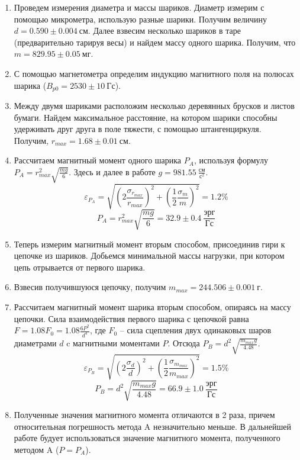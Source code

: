 \documentclass[14pt, a4paper]{report}
\begin{document}
\begin{enumerate}

\setcounter{enumi}{0}

\item Проведем измерения диаметра и массы шариков. Диаметр измерим с помощью микрометра, использую разные шарики. Получим величину $d=0.590\pm0.004\ см$. Далее взвесим несколько шариков в таре (предварительно тарируя весы) и найдем массу одного шарика. Получим, что $m=829.95\pm0.05\ мг$.

\item С помощью магнетометра определим индукцию магнитного поля на полюсах шарика ($B_{p0}=2530\pm10\ Гс$).

\item Между двумя шариками расположим несколько деревянных брусков и листов бумаги. Найдем максимальное расстояние, на котором шарики способны удерживать друг друга в поле тяжести, с помощью штангенциркуля. Получим, $r_{max}=1.68\pm0.01\ см$.

\item Рассчитаем магнитный момент одного шарика $P_A$, используя формулу $P_A=r_{max}^2\sqrt{\frac{mg}{6}}$. Здесь и далее в работе $g=981.55\ \frac{см}{с^2}$.
\[\varepsilon_{P_A}=\sqrt{\left(2\frac{\sigma_{r_{max}}}{r_{max}}\right)^2+\left(\frac{1}{2}\frac{\sigma_m}{m}\right)^2}=1.2 \%\]
\[P_A=r_{max}^2\sqrt{\frac{mg}{6}}=32.9\pm0.4\ \frac{эрг}{Гс}\]

\item Теперь измерим магнитный момент вторым способом, присоединив гири к цепочке из шариков. Добьемся минимальной массы нагрузки, при котором цепь отрывается от первого шарика.

\item Взвесив получившуюся цепочку, получим $m_{max}=244.506\pm0.001\ г$.

\item Рассчитаем магнитный момент шарика вторым способом, опираясь на массу цепочки. Сила взаимодействия первого шарика с цепочкой равна $F=1.08F_0=1.08\frac{6P^2}{d^4}$, где $F_0$ -- сила сцепления двух одинаковых шаров диаметрами $d$ c магнитными моментами $P$. Отсюда $P_B=d^2\sqrt{\frac{m_{max}g}{4.48}}$.
\[\varepsilon_{P_B}=\sqrt{\left(2\frac{\sigma_{d}}{d}\right)^2+\left(\frac{1}{2}\frac{\sigma_{m_{max}}}{m_{max}}\right)^2}=1.5 \%\]
\[P_B=d^2\sqrt{\frac{m_{max}g}{4.48}}=66.9\pm1.0\ \frac{эрг}{Гс}\]

\item Полученные значения магнитного момента отличаются в 2 раза, причем относительная погрешность метода A незначительно меньше. В дальнейшей работе будует использоваться значение магнитного момента, полученного методом A ($P=P_A$).


\end{enumerate}
\end{document}
